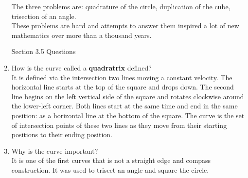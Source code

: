 \documentclass[12pt]{article}
\renewcommand{\emph}[1]{\textsf{\textbf{#1}}}
\begin{document}
\begin{enumerate}
The three problems are: quadrature of the circle, duplication of the cube, trisection of an angle.\\
These problems are hard and attempts to answer them inspired a lot of new mathematics over more than a thousand years.\\

\begin{center} Section 3.5 Questions \end{center}

\item How is the curve called a \emph{quadratrix} defined?\\

It is defined via the intersection two lines moving a constant velocity. The horizontal line starts at the top of the square and drops down. The second line begins on the left vertical side of the square and rotates clockwise around the lower-left corner. Both lines start at the same time and end in the same position: as a horizontal line at the bottom of the square. The curve is the set of intersection points of these two lines as they move from their starting positions to their ending position.\\
\item Why is the curve important?\\
It is one of the first curves that is not a straight edge and compass construction. It was used to trisect an angle and square the circle.

\end{enumerate}
\end{document}
